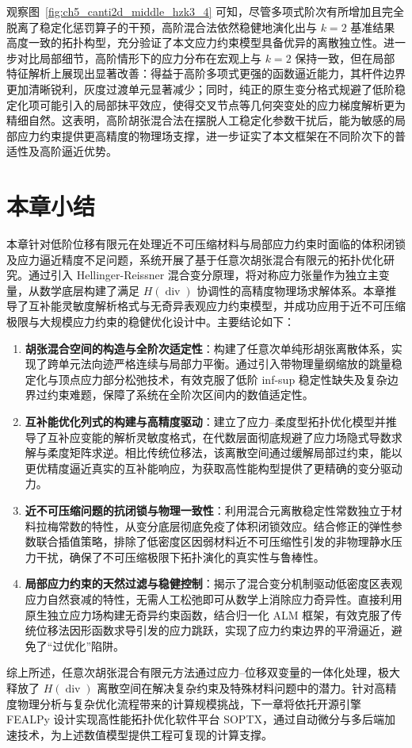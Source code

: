 观察图~\ref{fig:ch5_canti2d_middle_hzk3_4} 可知，尽管多项式阶次有所增加且完全脱离了稳定化惩罚算子的干预，高阶混合法依然稳健地演化出与 $k=2$ 基准结果高度一致的拓扑构型，充分验证了本文应力约束模型具备优异的离散独立性。进一步对比局部细节，高阶情形下的应力分布在宏观上与 $k=2$ 保持一致，但在局部特征解析上展现出显著改善：得益于高阶多项式更强的函数逼近能力，其杆件边界更加清晰锐利，灰度过渡单元显著减少；同时，纯正的原生变分格式规避了低阶稳定化项可能引入的局部抹平效应，使得交叉节点等几何突变处的应力梯度解析更为精细自然。这表明，高阶胡张混合法在摆脱人工稳定化参数干扰后，能为敏感的局部应力约束提供更高精度的物理场支撑，进一步证实了本文框架在不同阶次下的普适性及高阶逼近优势。


\section{本章小结}
\label{sec:hz_summary}

本章针对低阶位移有限元在处理近不可压缩材料与局部应力约束时面临的体积闭锁及应力逼近精度不足问题，系统开展了基于任意次胡张混合有限元的拓扑优化研究。通过引入 Hellinger-Reissner 混合变分原理，将对称应力张量作为独立主变量，从数学底层构建了满足 $H(\operatorname{div})$ 协调性的高精度物理场求解体系。本章推导了互补能灵敏度解析格式与无奇异表观应力约束模型，并成功应用于近不可压缩极限与大规模应力约束的稳健优化设计中。主要结论如下：

\begin{enumerate}
	\item \textbf{胡张混合空间的构造与全阶次适定性}：构建了任意次单纯形胡张离散体系，实现了跨单元法向迹严格连续与局部力平衡。通过引入带物理量纲缩放的跳量稳定化与顶点应力部分松弛技术，有效克服了低阶 inf-sup 稳定性缺失及复杂边界过约束难题，保障了系统在全阶次区间内的数值适定性。
	
	\item \textbf{互补能优化列式的构建与高精度驱动}：建立了应力--柔度型拓扑优化模型并推导了互补应变能的解析灵敏度格式，在代数层面彻底规避了应力场隐式导数求解与柔度矩阵求逆。相比传统位移法，该离散空间通过缓解局部过约束，能以更优精度逼近真实的互补能响应，为获取高性能构型提供了更精确的变分驱动力。
	
	\item \textbf{近不可压缩问题的抗闭锁与物理一致性}：利用混合元离散稳定性常数独立于材料拉梅常数的特性，从变分底层彻底免疫了体积闭锁效应。结合修正的弹性参数联合插值策略，排除了低密度区因弱材料近不可压缩性引发的非物理静水压力干扰，确保了不可压缩极限下拓扑演化的真实性与鲁棒性。
	
	\item \textbf{局部应力约束的天然过滤与稳健控制}：揭示了混合变分机制驱动低密度区表观应力自然衰减的特性，无需人工松弛即可从数学上消除应力奇异性。直接利用原生独立应力场构建无奇异约束函数，结合归一化 ALM 框架，有效克服了传统位移法因形函数求导引发的应力跳跃，实现了应力约束边界的平滑逼近，避免了“过优化”陷阱。
\end{enumerate}

综上所述，任意次胡张混合有限元方法通过应力--位移双变量的一体化处理，极大释放了 $H(\operatorname{div})$ 离散空间在解决复杂约束及特殊材料问题中的潜力。针对高精度物理分析与复杂优化流程带来的计算规模挑战，下一章将依托开源引擎 FEALPy 设计实现高性能拓扑优化软件平台 SOPTX，通过自动微分与多后端加速技术，为上述数值模型提供工程可复现的计算支撑。



